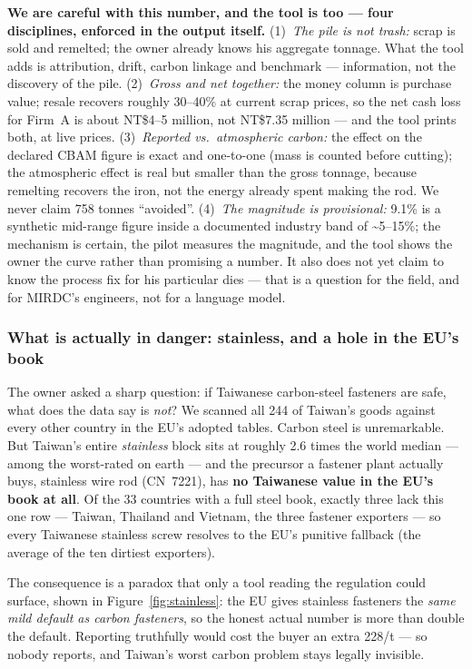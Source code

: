 \documentclass[11pt]{article}
\newcommand{\euro}{\texteuro}
\begin{document}
\begin{honestbox}
\textbf{We are careful with this number, and the tool is too --- four disciplines, enforced in the output itself.} (1)~\emph{The pile is not trash:} scrap is sold and remelted; the owner already knows his aggregate tonnage. What the tool adds is attribution, drift, carbon linkage and benchmark --- information, not the discovery of the pile. (2)~\emph{Gross and net together:} the money column is purchase value; resale recovers roughly 30--40\% at current scrap prices, so the net cash loss for Firm~A is about NT\$4--5 million, not NT\$7.35 million --- and the tool prints both, at live prices. (3)~\emph{Reported vs.\ atmospheric carbon:} the effect on the declared CBAM figure is exact and one-to-one (mass is counted before cutting); the atmospheric effect is real but smaller than the gross tonnage, because remelting recovers the iron, not the energy already spent making the rod. We never claim 758 tonnes ``avoided''. (4)~\emph{The magnitude is provisional:} 9.1\% is a synthetic mid-range figure inside a documented industry band of \textasciitilde5--15\%; the mechanism is certain, the pilot measures the magnitude, and the tool shows the owner the curve rather than promising a number. It also does not yet claim to know the process fix for his particular dies --- that is a question for the field, and for MIRDC's engineers, not for a language model.
\end{honestbox}

\subsubsection{What is actually in danger: stainless, and a hole in the EU's book}
The owner asked a sharp question: if Taiwanese carbon-steel fasteners are safe, what does the data say is \emph{not}? We scanned all 244 of Taiwan's goods against every other country in the EU's adopted tables. Carbon steel is unremarkable. But Taiwan's entire \emph{stainless} block sits at roughly 2.6 times the world median --- among the worst-rated on earth --- and the precursor a fastener plant actually buys, stainless wire rod (CN~7221), has \textbf{no Taiwanese value in the EU's book at all}. Of the 33 countries with a full steel book, exactly three lack this one row --- Taiwan, Thailand and Vietnam, the three fastener exporters --- so every Taiwanese stainless screw resolves to the EU's punitive fallback (the average of the ten dirtiest exporters).

The consequence is a paradox that only a tool reading the regulation could surface, shown in Figure~\ref{fig:stainless}: the EU gives stainless fasteners the \emph{same mild default as carbon fasteners}, so the honest actual number is more than double the default. Reporting truthfully would cost the buyer an extra \euro{}228/t --- so nobody reports, and Taiwan's worst carbon problem stays legally invisible.
\end{document}
